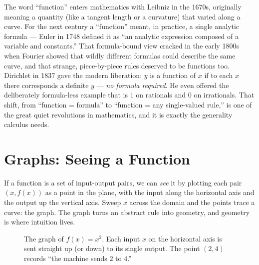 \begin{historybox}
The word ``function'' enters mathematics with Leibniz in the 1670s, originally
meaning a quantity (like a tangent length or a curvature) that varied along a
curve. For the next century a ``function'' meant, in practice, a single analytic
formula --- Euler in 1748 defined it as ``an analytic expression composed of a
variable and constants.'' That formula-bound view cracked in the early 1800s when
Fourier showed that wildly different formulas could describe the same curve, and
that strange, piece-by-piece rules deserved to be functions too. Dirichlet in 1837
gave the modern liberation: $y$ is a function of $x$ if to each $x$ there
corresponds a definite $y$ --- \emph{no formula required}. He even offered the
deliberately formula-less example that is $1$ on rationals and $0$ on irrationals.
That shift, from ``function = formula'' to ``function = any single-valued rule,''
is one of the great quiet revolutions in mathematics, and it is exactly the
generality calculus needs.
\end{historybox}

\section{Graphs: Seeing a Function}
\label{ch02:graphs}

If a function is a set of input-output pairs, we can \emph{see} it by plotting each
pair $(x, f(x))$ as a point in the plane, with the input along the horizontal axis
and the output up the vertical axis. Sweep $x$ across the domain and the points
trace a curve: the graph. The graph turns an abstract rule into geometry, and
geometry is where intuition lives.

\begin{figure}[H]
\centering
{}
\caption{The graph of $f(x)=x^2$. Each input $x$ on the horizontal axis is sent
straight up (or down) to its single output. The point $(2,4)$ records ``the
machine sends $2$ to $4$.''}
\label{ch02:fig-parabola}
\end{figure}

